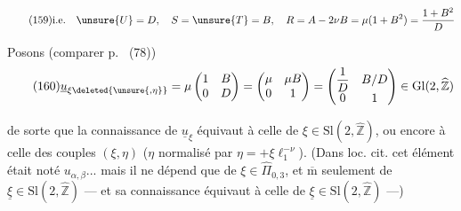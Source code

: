 
\[
\tag{159}
\text{i.e.}\quad
\unsure{U}=D,\quad S=\unsure{T}=B,\quad
R=A-2\nu B=\mu(1+B^2)=\frac{1+B^2}{D}
\]

Posons (comparer p.~ (78))
\[
\tag{160}
\underline u_{\xi\deleted{\unsure{,\eta}}}
=\mu\begin{pmatrix}1&B\\0&D\end{pmatrix}
=\begin{pmatrix}\mu&\mu B\\0&1\end{pmatrix}
=\begin{pmatrix}\dfrac1D&B/D\\0&1\end{pmatrix}
\in\mathrm{Gl}(2,\widehat{\mathbb Z})
\]


de sorte que la connaissance de $\underline u_\xi$ équivaut à celle  de $\xi\in\mathrm{Sl}(2,\widehat{\mathbb Z})$, ou encore à celle des couples $(\xi,\eta)$ ($\eta$ normalisé par $\eta=+\xi\ell_1^{-\nu}$). (Dans loc. cit. cet élément était noté $u_{\alpha,\beta}$... mais il ne dépend que de $\xi\in\widehat{\Pi}_{0,3}$, et $\overline{\mathrm m}$ seulement de $\underline\xi\in\mathrm{Sl}(2,\widehat{\mathbb Z})$ --- et sa connaissance équivaut à celle de $\underline\xi\in\mathrm{Sl}(2,\widehat{\mathbb Z})$ ---)


